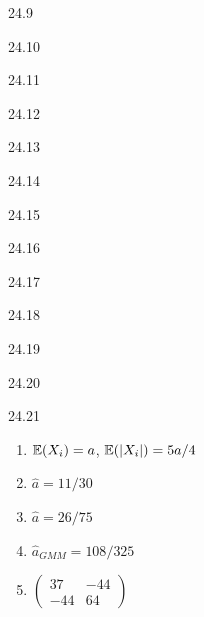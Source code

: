 \begin{solution}{{24.9}}
\end{solution}
\protect \hypertarget {soln:24.10}{}
\begin{solution}{{24.10}}
\end{solution}
\protect \hypertarget {soln:24.11}{}
\begin{solution}{{24.11}}
\end{solution}
\protect \hypertarget {soln:24.12}{}
\begin{solution}{{24.12}}
\end{solution}
\protect \hypertarget {soln:24.13}{}
\begin{solution}{{24.13}}
\end{solution}
\protect \hypertarget {soln:24.14}{}
\begin{solution}{{24.14}}
\end{solution}
\protect \hypertarget {soln:24.15}{}
\begin{solution}{{24.15}}
\end{solution}
\protect \hypertarget {soln:24.16}{}
\begin{solution}{{24.16}}
\end{solution}
\protect \hypertarget {soln:24.17}{}
\begin{solution}{{24.17}}
\end{solution}
\protect \hypertarget {soln:24.18}{}
\begin{solution}{{24.18}}
\end{solution}
\protect \hypertarget {soln:24.19}{}
\begin{solution}{{24.19}}
\end{solution}
\protect \hypertarget {soln:24.20}{}
\begin{solution}{{24.20}}
\end{solution}
\protect \hypertarget {soln:24.21}{}
\begin{solution}{{24.21}}
\begin{enumerate}
\item $\mathbb{E}(X_i) = a$, $\mathbb{E}(|X_i|) = 5a/4$
\item $\hat a = 11/30$
\item $\hat a = 26/75$
\item $\hat{a}_{GMM} = 108/325$
\item $\begin{pmatrix}
37 & -44 \\
-44 & 64
\end{pmatrix}$
\end{enumerate}
\end{solution}
